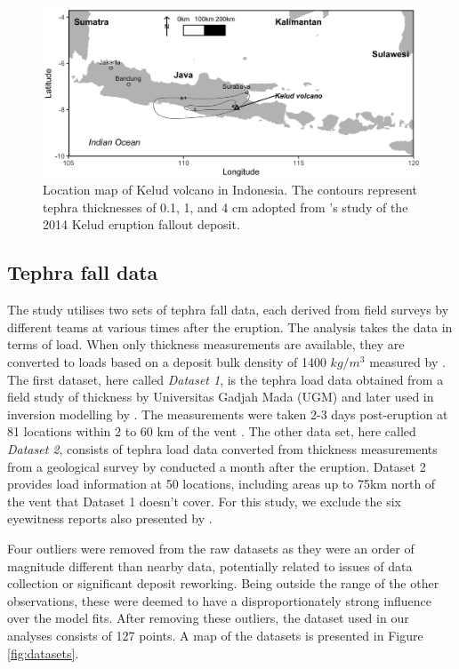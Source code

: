 \documentclass[a4paper,fleqn]{cas-sc}
\begin{document}
\begin{figure}[htbp]
\centering
\includegraphics[width=\linewidth]{Figures/fig2_inset-map.png}
\caption{Location map of Kelud volcano in Indonesia. The contours represent tephra thicknesses of 0.1, 1, and 4 cm adopted from \cite{MAENO201924}'s study of the 2014 Kelud eruption fallout deposit.}
\label{fig:insetmap}
\end{figure}

\subsection{Tephra fall data}\label{subsection-case-data}

The study utilises two sets of tephra fall data, each derived from field surveys by different teams at various times after the eruption. The analysis takes the data in terms of load. When only thickness measurements are available, they are converted to loads based on a deposit bulk density of 1400 $kg/m^{3}$ measured by \cite{MAENO201924}. The first dataset, here called \textit{Dataset 1}, is the tephra load data obtained from a field study of thickness by Universitas Gadjah Mada (UGM) \citep{anggorowati2015} and later used in inversion modelling by \citet{williams2020}. The measurements were taken 2-3 days post-eruption at 81 locations within 2 to 60 km of the vent \citep{williams2020}. The other data set, here called \textit{Dataset 2}, consists of tephra load data converted from thickness measurements from a geological survey by \citet{MAENO201924} conducted a month after the eruption. Dataset 2 provides load information at 50 locations, including areas up to 75km north of the vent that Dataset 1 doesn't cover. For this study, we exclude the six eyewitness reports also presented by \citet{MAENO201924}.

Four outliers were removed from the raw datasets as they were an order of magnitude different than nearby data, potentially related to issues of data collection or significant deposit reworking. Being outside the range of the other observations, these were deemed to have a disproportionately strong influence over the model fits. After removing these outliers, the dataset used in our analyses consists of 127 points. A map of the datasets is presented in Figure \ref{fig:datasets}.
\end{document}
